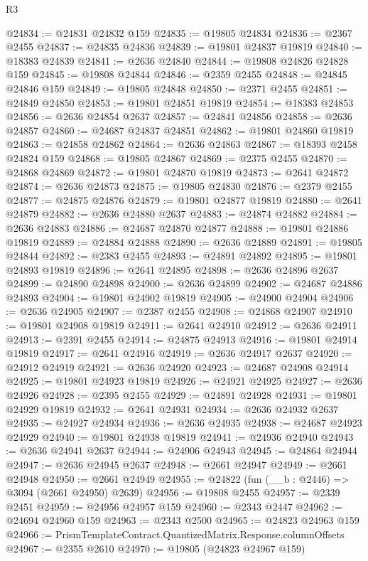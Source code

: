\begin{lexlean}{R3}
\begin{coremodule}
@24834 := @24831 @24832 @159
@24835 := @19805 @24834
@24836 := @2367 @2455
@24837 := @24835 @24836
@24839 := @19801 @24837 @19819
@24840 := @18383 @24839
@24841 := @2636 @24840
@24844 := @19808 @24826 @24828 @159
@24845 := @19808 @24844
@24846 := @2359 @2455
@24848 := @24845 @24846 @159
@24849 := @19805 @24848
@24850 := @2371 @2455
@24851 := @24849 @24850
@24853 := @19801 @24851 @19819
@24854 := @18383 @24853
@24856 := @2636 @24854 @2637
@24857 := @24841 @24856
@24858 := @2636 @24857
@24860 := @24687 @24837 @24851
@24862 := @19801 @24860 @19819
@24863 := @24858 @24862
@24864 := @2636 @24863
@24867 := @18393 @2458 @24824 @159
@24868 := @19805 @24867
@24869 := @2375 @2455
@24870 := @24868 @24869
@24872 := @19801 @24870 @19819
@24873 := @2641 @24872
@24874 := @2636 @24873
@24875 := @19805 @24830
@24876 := @2379 @2455
@24877 := @24875 @24876
@24879 := @19801 @24877 @19819
@24880 := @2641 @24879
@24882 := @2636 @24880 @2637
@24883 := @24874 @24882
@24884 := @2636 @24883
@24886 := @24687 @24870 @24877
@24888 := @19801 @24886 @19819
@24889 := @24884 @24888
@24890 := @2636 @24889
@24891 := @19805 @24844
@24892 := @2383 @2455
@24893 := @24891 @24892
@24895 := @19801 @24893 @19819
@24896 := @2641 @24895
@24898 := @2636 @24896 @2637
@24899 := @24890 @24898
@24900 := @2636 @24899
@24902 := @24687 @24886 @24893
@24904 := @19801 @24902 @19819
@24905 := @24900 @24904
@24906 := @2636 @24905
@24907 := @2387 @2455
@24908 := @24868 @24907
@24910 := @19801 @24908 @19819
@24911 := @2641 @24910
@24912 := @2636 @24911
@24913 := @2391 @2455
@24914 := @24875 @24913
@24916 := @19801 @24914 @19819
@24917 := @2641 @24916
@24919 := @2636 @24917 @2637
@24920 := @24912 @24919
@24921 := @2636 @24920
@24923 := @24687 @24908 @24914
@24925 := @19801 @24923 @19819
@24926 := @24921 @24925
@24927 := @2636 @24926
@24928 := @2395 @2455
@24929 := @24891 @24928
@24931 := @19801 @24929 @19819
@24932 := @2641 @24931
@24934 := @2636 @24932 @2637
@24935 := @24927 @24934
@24936 := @2636 @24935
@24938 := @24687 @24923 @24929
@24940 := @19801 @24938 @19819
@24941 := @24936 @24940
@24943 := @2636 @24941 @2637
@24944 := @24906 @24943
@24945 := @24864 @24944
@24947 := @2636 @24945 @2637
@24948 := @2661 @24947
@24949 := @2661 @24948
@24950 := @2661 @24949
@24955 := @24822 (fun (__b : @2446) => @3094 (@2661 @24950) @2639)
@24956 := @19808 @2455
@24957 := @2339 @2451
@24959 := @24956 @24957 @159
@24960 := @2343 @2447
@24962 := @24694 @24960 @159
@24963 := @2343 @2500
@24965 := @24823 @24963 @159
@24966 := PrismTemplateContract.QuantizedMatrix.Response.columnOffsets
@24967 := @2355 @2610
@24970 := @19805 (@24823 @24967 @159)

\end{coremodule}
\end{lexlean}
